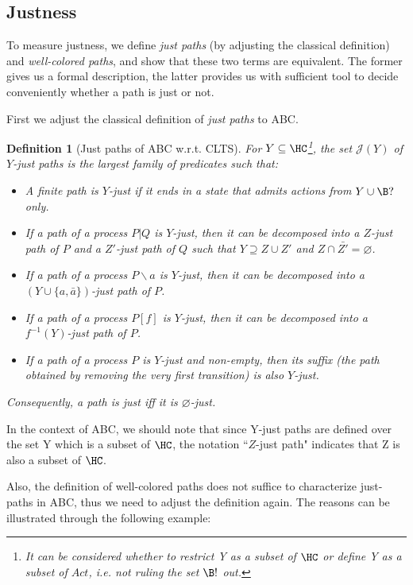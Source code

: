 \documentclass[adraft]{eptcs}
\newtheorem{defi}{Definition}
\begin{document}
\subsection{Justness}
To measure justness, we define \textit{just paths} (by adjusting the classical definition) and \textit{well-colored paths}, and show that these two terms are equivalent. The former gives us a formal description, the latter provides us with sufficient tool to decide conveniently whether a path is just or not.

First we adjust the classical definition of \textit{just paths} to ABC.
\begin{defi}[Just paths of ABC w.r.t. CLTS]
For $Y \subseteq \HC$\footnote{It can be considered whether to restrict Y as a subset of $\HC$ or define Y as a subset of $Act$, i.e. not ruling the set $\B!$ out.}, the set $\mathcal J(Y)$ of $Y$-just paths is the largest family of predicates such that:
\begin{itemize}
	\item A finite path is $Y$-just if it ends in a state that admits actions from $Y \cup \B?$ only.
	\item If a path of a process $P | Q$ is $Y$-just, then it can be decomposed into a $Z$-just path of $P$ and a $Z'$-just path of $Q$ such that $Y \supseteq Z \cup Z'$ and $Z \cap \bar{Z'} = \varnothing$.
	\item If a path of a process $P \backslash a$ is $Y$-just, then it can be decomposed into a $(Y \cup \{a, \bar a \})$-just path of $P$.
	\item If a path of a process $P[f]$ is $Y$-just, then it can be decomposed into a $f^{-1}(Y)$-just path of $P$.
	\item If a path of a process $P$ is $Y$-just and non-empty, then its suffix (the path obtained by removing the very first transition) is also $Y$-just.
\end{itemize}
Consequently, a path is just iff it is $\varnothing$-just.
\end{defi}

In the context of ABC, we should note that since Y-just paths are defined over the set Y which is a subset of $\HC$, the notation ``$Z$-just path" indicates that Z is also a subset of $\HC$.

Also, the definition of well-colored paths does not suffice to characterize just-paths in ABC, thus we need to adjust the definition again. The reasons can be illustrated through the following example:
\end{document}

